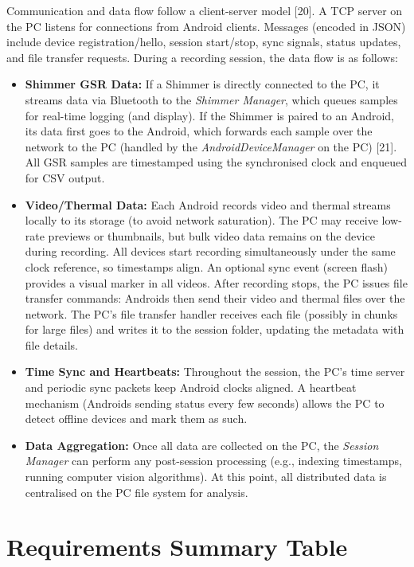 Communication and data flow follow a client-server model [20]. A TCP server on the PC listens for connections from Android clients. Messages (encoded in JSON) include device registration/hello, session start/stop, sync signals, status updates, and file transfer requests. During a recording session, the data flow is as follows:
\begin{itemize}
    \item \textbf{Shimmer GSR Data:} If a Shimmer is directly connected to the PC, it streams data via Bluetooth to the \textit{Shimmer Manager}, which queues samples for real-time logging (and display). If the Shimmer is paired to an Android, its data first goes to the Android, which forwards each sample over the network to the PC (handled by the \textit{AndroidDeviceManager} on the PC) [21]. All GSR samples are timestamped using the synchronised clock and enqueued for CSV output.
    \item \textbf{Video/Thermal Data:} Each Android records video and thermal streams locally to its storage (to avoid network saturation). The PC may receive low-rate previews or thumbnails, but bulk video data remains on the device during recording. All devices start recording simultaneously under the same clock reference, so timestamps align. An optional sync event (screen flash) provides a visual marker in all videos. After recording stops, the PC issues file transfer commands: Androids then send their video and thermal files over the network. The PC’s file transfer handler receives each file (possibly in chunks for large files) and writes it to the session folder, updating the metadata with file details.
    \item \textbf{Time Sync and Heartbeats:} Throughout the session, the PC’s time server and periodic sync packets keep Android clocks aligned. A heartbeat mechanism (Androids sending status every few seconds) allows the PC to detect offline devices and mark them as such.
    \item \textbf{Data Aggregation:} Once all data are collected on the PC, the \textit{Session Manager} can perform any post-session processing (e.g., indexing timestamps, running computer vision algorithms). At this point, all distributed data is centralised on the PC file system for analysis.
\end{itemize}


\section{Requirements Summary Table}

